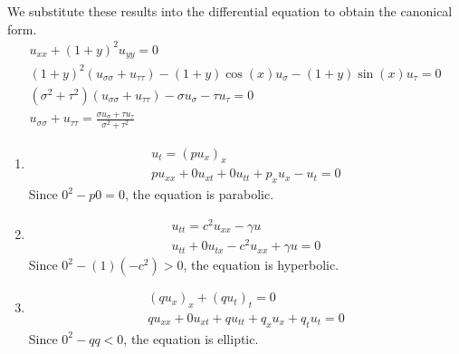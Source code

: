 {\begin{Solution}
  We substitute these results into the differential equation to obtain the 
  canonical form.
  \begin{gather*}
    u_{x x} + (1 + y)^2 u_{y y} = 0
    \\
    (1 + y)^2 \left( u_{\sigma \sigma} + u_{\tau \tau} \right) 
    - (1 + y) \cos(x) u_\sigma - (1 + y) \sin(x) u_\tau = 0
    \\
    \left( \sigma^2 + \tau^2 \right) \left( u_{\sigma \sigma} + u_{\tau \tau} \right) - \sigma u_\sigma - \tau u_\tau = 0
    \\
    \boxed{
      u_{\sigma \sigma} + u_{\tau \tau} = \frac{ \sigma u_\sigma + \tau u_\tau }{ \sigma^2 + \tau^2 }
      }
  \end{gather*}
\end{Solution}









\begin{Solution}
  \label{solution classify ut=puxx}
  \begin{enumerate}


  \item
    \begin{gather*}
      u_t = (p u_x)_x 
      \\
      p u_{x x} + 0 u_{x t} + 0 u_{t t} + p_x u_x - u_t = 0
    \end{gather*}
    Since $0^2 - p 0 = 0$, the equation is parabolic.


  \item
    \begin{gather*}
      u_{tt} = c^2 u_{xx} - \gamma u 
      \\
      u_{tt} + 0 u_{t x} - c^2 u_{xx} + \gamma u = 0
    \end{gather*}
    Since $0^2 - (1)(-c^2) > 0$, the equation is hyperbolic.


  \item
    \begin{gather*}
      (q u_x)_x + (q u_t)_t = 0 
      \\
      q u_{x x} + 0 u_{x t} + q u_{t t} + q_x u_x + q_t u_t = 0
    \end{gather*}
    Since $0^2 - q q < 0$, the equation is elliptic.
  \end{enumerate}
\end{Solution}












}
